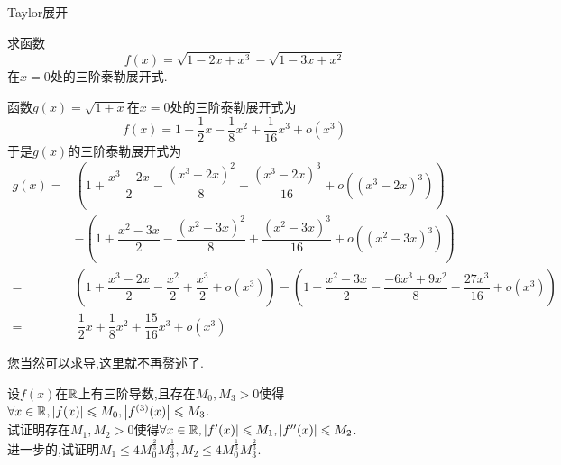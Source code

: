 \documentclass{ctexart}
\begin{document}
\pagestyle{empty}
\begin{center}\large Taylor展开\end{center}
\begin{problem}[Example 1.]
    求函数$$f(x)=\sqrt{1-2x+x^3}-\sqrt{1-3x+x^2}$$
    在$x=0$处的三阶泰勒展开式.
\end{problem}
\begin{solution}
    函数$g(x)=\sqrt{1+x}$在$x=0$处的三阶泰勒展开式为
    $$f(x)=1+\dfrac{1}{2}x-\dfrac{1}{8}x^2+\dfrac{1}{16}x^3+o\left(x^3\right)$$
    于是$g(x)$的三阶泰勒展开式为
    $$\begin{aligned}
        g(x)
        = &\left(1+\dfrac{x^3-2x}{2}-\dfrac{\left(x^3-2x\right)^2}{8}+\dfrac{\left(x^3-2x\right)^3}{16}+o\left(\left(x^3-2x\right)^3\right)\right) \\
          &-\left(1+\dfrac{x^2-3x}{2}-\dfrac{\left(x^2-3x\right)^2}{8}+\dfrac{\left(x^2-3x\right)^3}{16}+o\left(\left(x^2-3x\right)^3\right)\right) \\
        = &\left(1+\dfrac{x^3-2x}{2}-\dfrac{x^2}{2}+\dfrac{x^3}{2}+o(x^3)\right)-\left(1+\dfrac{x^2-3x}{2}-\dfrac{-6x^3+9x^2}{8}-\dfrac{27x^3}{16}+o(x^3)\right) \\
        = &\ \dfrac{1}{2}x+\dfrac{1}{8}x^2+\dfrac{15}{16}x^3+o(x^3)
    \end{aligned}$$
\end{solution}
\begin{solution}
    您当然可以求导,这里就不再赘述了.
\end{solution}
\begin{problem}
    设$f(x)$在$\mathbb{R}$上有三阶导数,且存在$M_0,M_3>0$使得$\forall x\in\mathbb{R},\left|f(x)\right|\leqslant M_0,\left|f^{(3)}(x)\right|\leqslant M_3$.\\
    试证明存在$M_1,M_2>0$使得$\forall x\in\mathbb{R},\left|f'(x)\right|\leqslant M_1,\left|f''(x)\right|\leqslant M_2$.\\
    进一步的,试证明$M_1\leqslant4M_0^{\frac{2}{3}}M_3^{\frac{1}{3}},M_2\leqslant4M_0^{\frac{1}{3}}M_3^{\frac{2}{3}}$.
\end{problem}
\end{document}

